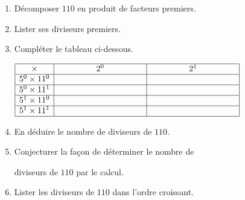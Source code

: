\begin{exercice*}
    \begin{enumerate}
        \item Décomposer $110$ en produit de facteurs premiers.
        \item Lister ses diviseurs premiers.
        \item Compléter le tableau ci-dessous.
        
        \smallskip
        $\begin{array}{|c|c|c|}
        \hline
        \times & \phantom{plusLarge}2^{0}\phantom{plusLarge} & \phantom{plusLarge}2^{1}\phantom{plusLarge}\\
        \hline
        5^{0}\times11^{0} &  & \\
        \hline
        5^{0}\times11^{1} &  & \\
        \hline
        5^{1}\times11^{0} &  & \\
        \hline
        5^{1}\times11^{1} &  & \\
        \hline
        \end{array}$
        \smallskip
        \item En déduire le nombre de diviseurs de $110$.
        \item Conjecturer la façon de déterminer le nombre de
        
        diviseurs de $110$ par le calcul.
        \item Lister les diviseurs de $110$ dans l'ordre croissant.
    \end{enumerate}
\end{exercice*}
